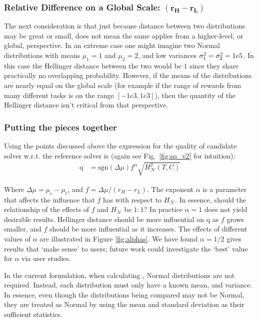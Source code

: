 \subsubsection{Relative Difference on a Global Scale: $\pmb{(r_H-r_L)}$}
The next consideration is that just because distance between two distributions may be great or small, does not mean the same applies from a higher-level, or global, perspective. In an extreme case one might imagine two Normal distributions with means $\mu_1=1$ and $\mu_2=2$, and low variances $\sigma_1^2=\sigma_2^2=1e\-5$. In this case the Hellinger distance between the two would be $1$ since they share practically no overlapping probability. However, if the means of the distributions are nearly equal on the global scale (for example if the range of rewards from many different tasks is on the range $[-1e3,1e3]$), then the quantity of the Hellinger distance isn't critical from that perspective.

\subsubsection{Putting the pieces together}
Using the points discussed above the expression for the quality of candidate solver \solve{} w.r.t. the reference solver \solvestar{} is (again see Fig.~\ref{fig:sq_v2} for intuition):
\begin{align}
    \text{q} &= \text{sgn}(\Delta \mu)f^{\alpha}\sqrt{H_{\mathcal{N}}^{2}(T,C)} \label{eq:q}
\end{align}

Where $\Delta \mu = \mu_c-\mu_t$, and $f = \Delta \mu/(r_H-r_L)$. The exponent $\alpha$ is a parameter that affects the influence that $f$ has with respect to $H_{\mathcal{N}}$. In essence, should the relationship of the effects of $f$ and $H_{\mathcal{N}}$ be $1:1$? In practice $\alpha=1$ does not yield desirable results. Hellinger distance should be more influential on $\text{q}$ as $f$ grows smaller, and $f$ should be more influential as it increases. The effects of different values of $\alpha$ are illustrated in Figure \ref{fig:alphas}. We have found $\alpha=1/2$ gives results that `make sense' to users; future work could investigate the `best' value for $\alpha$ via user studies.

In the current formulation, when calculating \xQ, Normal distributions are not required. Instead, each distribution must only have a known mean, and variance. In essence, even though the distributions being compared may not be Normal, they are treated as Normal by using the mean and standard deviation as their sufficient statistics.

